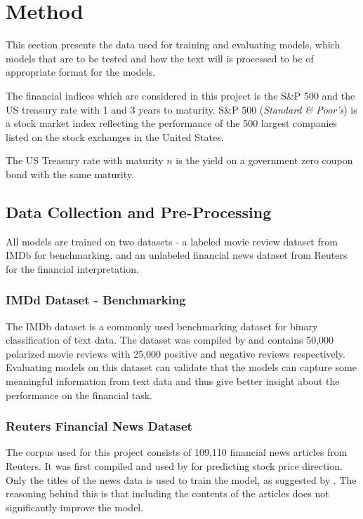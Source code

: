 \chapter{Method}

This section presents the data used for training and evaluating models, which models that are to be tested and how the text will is processed to be of appropriate format for the models. 

The financial indices which are considered in this project is the S\&P 500 and the US treasury rate with 1 and 3 years to maturity. S\&P 500 (\textit{Standard \& Poor's}) is a stock market index reflecting the performance of the 500 largest companies listed on the stock exchanges in the United States.

The US Treasury rate with maturity $n$ is the yield on a government zero coupon bond with the same maturity. 

\section{Data Collection and Pre-Processing}

All models are trained on two datasets - a labeled movie review dataset from IMDb for benchmarking, and an unlabeled financial news dataset from Reuters for the financial interpretation. 

\subsection{IMDd Dataset - Benchmarking}

The IMDb dataset is a commonly used benchmarking dataset for binary classification of text data. The dataset was compiled by \citet{maas-EtAl:2011:ACL-HLT2011} and contains 50,000 polarized movie reviews with 25,000 positive and negative reviews respectively. Evaluating models on this dataset can validate that the models can capture some meaningful information from text data and thus give better insight about the performance on the financial task. 

\subsection{Reuters Financial News Dataset}

The corpus used for this project consists of 109,110 financial news articles from Reuters. It was first compiled and used by \citet{ding2014using} for predicting stock price direction. Only the titles of the news data is used to train the model, as suggested by \citet{ding2014using}. The reasoning behind this is that including the contents of the articles does not significantly improve the model. 

